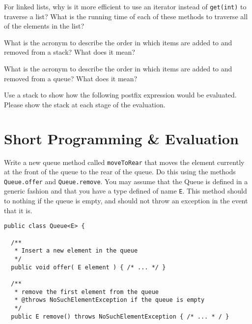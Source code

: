 \documentclass[11pt]{exam}
\begin{document}
\begin{questions}

\question[6] For linked lists, why is it more efficient to use an iterator instead of {\tt get(int)} to traverse a list?  What is the running time of each of these methods to traverse all of the elements in the list?
\vspace{1.5in}

\question[4] What is the acronym to describe the order in which items are added to and removed from a stack?  What does it mean?
\vspace{1.5in}

\question[4] What is the acronym to describe the order in which items are added to and removed from a queue? What does it mean?
\vspace{1.5in}

\question[6] Use a stack to show how the following postfix expression would be evaluated.   Please show the stack at each stage of the evaluation. 
\vspace{4in}

\newpage
\section*{Short Programming \& Evaluation}

\question[10] Write a new queue method called {\tt moveToRear} that moves the element currently at the front of the queue to the rear of the queue.   Do this using the methods {\tt Queue.offer} and {\tt Queue.remove}.  You may assume that the Queue is defined in a generic fashion and that you have a type defined of name {\tt E}.  This method should to nothing if the queue is empty, and should not throw an exception in the event that it is.
\begin{verbatim}
public class Queue<E> {
  
  /**
   * Insert a new element in the queue
   */
  public void offer( E element ) { /* ... */ }
  
  /**
   * remove the first element from the queue
   * @throws NoSuchElementException if the queue is empty
   */
  public E remove() throws NoSuchElementException { /* ... * / }


\end{verbatim}
\end{questions}
\end{document}
